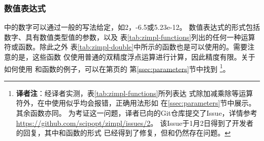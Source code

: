 \subsubsection{数值表达式}
\zimpl 中的数字可以通过一般的写法给定，如2，-6.5或5.23e-12。
数值表达式的形式包括数字、具有数值类型值的参数，以及
表\ref{tab:zimpl-functions}列出的任何一种运算符或函数。除此之外
表\ref{tab:zimpl-double}中所示的函数也是可以使用的。需要注意的是，这些函数
仅使用普通的双精度浮点运算进行计算，因此精度有限。关于如何使用
和函数的例子，可以在第\pageref{ssec:parameters}页的
第\ref{ssec:parameters}节中找到
\footnote{\textbf{译者注}：经译者实测，表\ref{tab:zimpl-functions}所列表达
  式除加减乘除等运算符外，在\zimpl 中使用似乎均会报错，正确用法形如
  在\ref{ssec:parameters}节中展示。其余函数亦同。
  为考证这一问题，译者已向\zimpl 的Git仓库提交了Issue，详情参考
  \url{https://github.com/scipopt/zimpl/issues/2}\label{fn:translator_1}。
  该Issue于1月2日得到了开发者的回复，其中和函数的形式
  已经得到了修复，但和仍然存在问题。
}。

